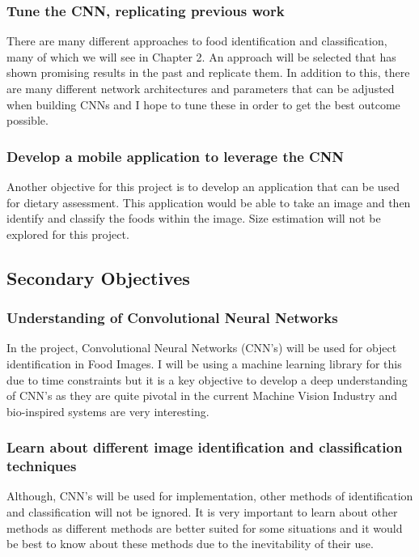 \subsubsection*{Tune the CNN, replicating previous work}
There are many different approaches to food identification and classification,
many of which we will see in Chapter 2. An approach will be selected that has
shown promising results in the past and replicate them. In addition to this, there are many different network architectures and parameters that can be adjusted when building CNNs and I hope to tune these in order to get the best outcome possible.

\subsubsection*{Develop a mobile application to leverage the CNN}
Another objective for this project is to develop an application that can be used
for dietary assessment. This application would be able to take an image and then
identify and classify the foods within the image. Size estimation will not be explored for this project.

\subsection*{Secondary Objectives}
\subsubsection*{Understanding of Convolutional Neural Networks}
In the project, Convolutional Neural Networks (CNN's) will be used for object identification in Food Images.
I will be using a machine learning library for this due to time constraints but it is a key
objective to develop a deep understanding of CNN's as they are quite pivotal in the current Machine Vision Industry and bio-inspired systems are very interesting.

\subsubsection*{Learn about different image identification and classification techniques}
Although, CNN's will be used for implementation, other methods of identification and classification will not be ignored.
It is very important to learn about other methods as different methods
are better suited for some situations and it would be best to know about these methods due to the inevitability of their use.


